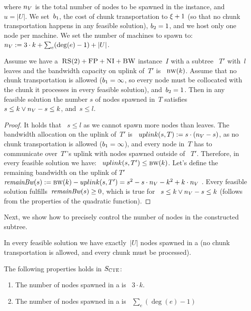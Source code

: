 where $n_V$ is the total number of nodes to be spawned in the instance, and $u = |U|$.
  We
set~$b_1$, the cost of chunk transportation to $\xi+1$ (so that no chunk transportation happens in any feasible solution), 
$b_2 = 1$, and we host only one node per machine. We set the
number of machines to spawn to:
$n_V := 3\cdot k + \sum_e (\deg(e)-1) + |U|$.
\\

\begin{lemma}
  Assume we have a~$\textsc{RS}(2)+\textsc{FP}+\textsc{NI}+\textsc{BW}$ instance~$I$ with a subtree
 ~$T'$ with~$l$ leaves and the bandwidth capacity on uplink of~$T'$ is
 ~$\textsc{bw}(k)$. Assume that no chunk transportation is allowed
  ($b_1 = \infty$, so every node must be collocated with the
  chunk it processes in every feasible solution), and~$b_2 = 1$.
  Then in any feasible solution the number $s$ of nodes spawned in~$T$ satisfies~$s \leq k \vee n_V-s\leq k$, and~$s \leq l$.
  \label{lem:bandwidth1}
\end{lemma}

\begin{proof}
It holds that ~$s\leq l$ as we cannot spawn more nodes than leaves.
  The bandwidth allocation on the uplink of~$T'$ is
 ~$uplink(s,T) := s\cdot (n_V - s)$, as no chunk transportation
  is allowed ($b_1 = \infty$), and every node in~$T$ has to
  communicate over~$T'$'s uplink with nodes spawned outside of
 ~$T'$. Therefore, in every feasible solution we have:
 ~$uplink(s, T') \leq \textsc{bw}(k)$.  Let's define the remaining bandwidth
  on the uplink of $T'$~$\textit{remainBw}(s) := \textsc{bw}(k)-uplink(s, T') = s^2 - s\cdot n_V -
  k^2+k\cdot n_V~$.
  Every feasible solution fulfills~$\textit{remainBw}(s) \geq 0$, which is true for
 ~$s \leq k \vee n_V-s\leq k$ (follows from the properties of the
  quadratic function).
\end{proof}


Next, we show how to precisely control the number of nodes in the
constructed subtree.

\begin{obs}
  In every feasible solution we have exactly~$|U|$ nodes spawned in a
  {\UnqSubtree} (no chunk transportation is allowed, and every chunk must be processed).
  \label{obs:unq-full}
\end{obs}


\begin{lemma}
  The following properties holds in $S_{\mathrm{\textsc{CTE}}}$:
  \begin{enumerate}
    \item The number of nodes spawned in a {\MatchSubtree} is
   ~$3\cdot k$.
    \item The number of nodes spawned in a {\CoverSubtree} is
   ~$\sum_e(\deg(e)-1)$
  \end{enumerate}

  \label{lem:bandwidth2}
\end{lemma}

